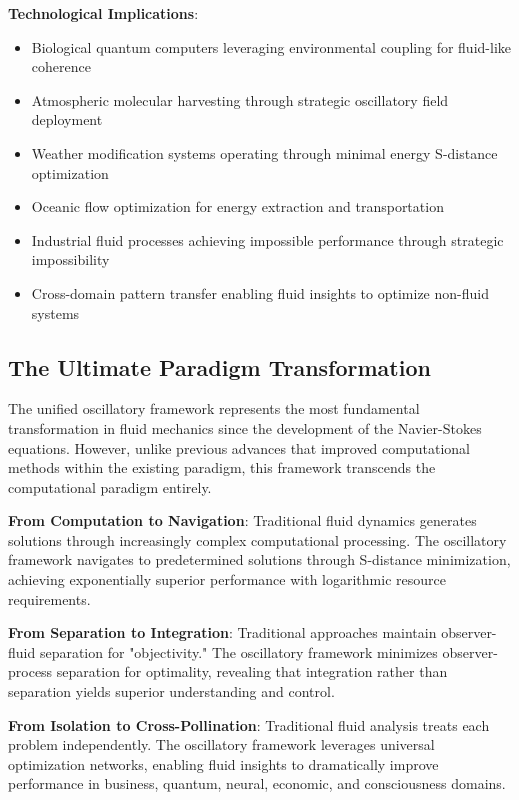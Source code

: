 \documentclass[12pt,a4paper]{article}
\begin{document}
\textbf{Technological Implications}:
\begin{itemize}
\item Biological quantum computers leveraging environmental coupling for fluid-like coherence
\item Atmospheric molecular harvesting through strategic oscillatory field deployment
\item Weather modification systems operating through minimal energy S-distance optimization
\item Oceanic flow optimization for energy extraction and transportation
\item Industrial fluid processes achieving impossible performance through strategic impossibility
\item Cross-domain pattern transfer enabling fluid insights to optimize non-fluid systems
\end{itemize}

\subsection{The Ultimate Paradigm Transformation}

The unified oscillatory framework represents the most fundamental transformation in fluid mechanics since the development of the Navier-Stokes equations. However, unlike previous advances that improved computational methods within the existing paradigm, this framework transcends the computational paradigm entirely.

\textbf{From Computation to Navigation}:
Traditional fluid dynamics generates solutions through increasingly complex computational processing. The oscillatory framework navigates to predetermined solutions through S-distance minimization, achieving exponentially superior performance with logarithmic resource requirements.

\textbf{From Separation to Integration}:
Traditional approaches maintain observer-fluid separation for "objectivity." The oscillatory framework minimizes observer-process separation for optimality, revealing that integration rather than separation yields superior understanding and control.

\textbf{From Isolation to Cross-Pollination}:
Traditional fluid analysis treats each problem independently. The oscillatory framework leverages universal optimization networks, enabling fluid insights to dramatically improve performance in business, quantum, neural, economic, and consciousness domains.
\end{document}
